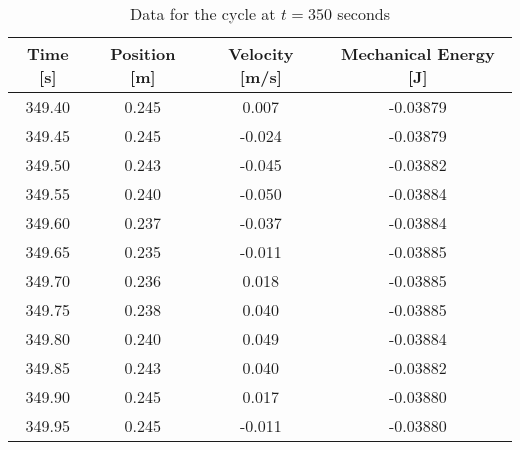 \documentclass{article}
\begin{document}
            \begin{table}[H]
                \centering
                \begin{tabular}{|c|c|c|c|}
                    \hline
                    Time [s] & Position [m] & Velocity [m/s] & Mechanical Energy [J] \\
                    \hline
                    349.40   & 0.245        & 0.007          & -0.03879              \\
                    \hline
                    349.45   & 0.245        & -0.024         & -0.03879              \\
                    \hline
                    349.50   & 0.243        & -0.045         & -0.03882              \\
                    \hline
                    349.55   & 0.240        & -0.050         & -0.03884              \\
                    \hline
                    349.60   & 0.237        & -0.037         & -0.03884              \\
                    \hline
                    349.65   & 0.235        & -0.011         & -0.03885              \\
                    \hline
                    349.70   & 0.236        & 0.018          & -0.03885              \\
                    \hline
                    349.75   & 0.238        & 0.040          & -0.03885              \\
                    \hline
                    349.80   & 0.240        & 0.049          & -0.03884              \\
                    \hline
                    349.85   & 0.243        & 0.040          & -0.03882              \\
                    \hline
                    349.90   & 0.245        & 0.017          & -0.03880              \\
                    \hline
                    349.95   & 0.245        & -0.011         & -0.03880              \\
                    \hline
                \end{tabular} %
                \caption{Data for the cycle at $t=350$ seconds}\label{tab:cycle-at-350-seconds-mechanical-energy-table}
            \end{table}
            
\end{document}
